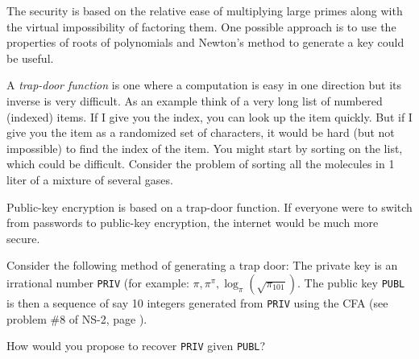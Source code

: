 \documentclass{ximera}
\begin{document}
The security is based on the relative ease of multiplying large primes along with the virtual impossibility of factoring them.
One possible approach is to use the properties of roots of polynomials and Newton's method \citep{Allen24} to generate a key could be useful.

A \emph{trap-door function} is one where a computation is easy in one direction but its inverse is very difficult. 
As an example think of a very long list of numbered (indexed) items. If I give you the index, you can look up the item quickly. But if I give you the item as a randomized set of characters, it would be hard (but not impossible) to find the index of the item.
You might start by sorting on the list, which could be difficult.
Consider the problem of sorting all the molecules in 1 liter of a mixture of several gases.
  
Public-key encryption is based on a trap-door function. %
If everyone were to switch from passwords to public-key encryption,
the internet would be much more secure.%
  

\BEx
Consider the following method of generating a trap door: The private key is an irrational number \texttt{PRIV} (for example: $\pi, \pi^\pi, \log_\pi(\sqrt{\pi_{101}})$.
The public key \texttt{PUBL} is then a sequence of say 10 integers generated from \texttt{PRIV} using the CFA (see problem \#8 of NS-2, page \pageref{sect:cont_frac}).

How would you propose to recover \texttt{PRIV} given \texttt{PUBL}?

\EEx
\end{document}
